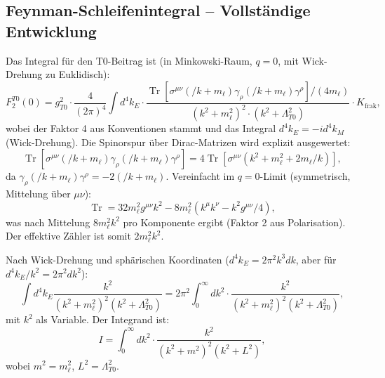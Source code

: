 \documentclass[12pt,a4paper]{article}
\begin{document}
	\subsection{Feynman-Schleifenintegral – Vollständige Entwicklung}
	Das Integral für den T0-Beitrag ist (in Minkowski-Raum, $q=0$, mit Wick-Drehung zu Euklidisch):
	\begin{equation}
		F_2^{T0}(0) = g_{T0}^2 \cdot \frac{4}{(2\pi)^4} \int d^4k_E \cdot \frac{\operatorname{Tr} \left[ \sigma^{\mu\nu} (\slash{k} + m_\ell) \gamma_\rho (\slash{k} + m_\ell) \gamma^\rho \right] / (4 m_\ell)}{ (k^2 + m_\ell^2)^2 \cdot (k^2 + \Lambda_{T0}^2) } \cdot K_\text{frak},
	\end{equation}
	wobei der Faktor 4 aus Konventionen stammt und das Integral $d^4k_E = -i d^4k_M$ (Wick-Drehung). Die Spinorspur über Dirac-Matrizen wird explizit ausgewertet:
	\begin{equation}
		\operatorname{Tr} \left[ \sigma^{\mu\nu} (\slash{k} + m_\ell) \gamma_\rho (\slash{k} + m_\ell) \gamma^\rho \right] = 4 \operatorname{Tr} \left[ \sigma^{\mu\nu} (k^2 + m_\ell^2 + 2 m_\ell \slash{k}) \right],
	\end{equation}
	da $\gamma_\rho (\slash{k} + m_\ell) \gamma^\rho = -2 (\slash{k} + m_\ell)$. Vereinfacht im $q=0$-Limit (symmetrisch, Mittelung über $\mu\nu$):
	\begin{equation}
		\operatorname{Tr} = 32 m_\ell^2 g^{\mu\nu} k^2 - 8 m_\ell^2 (k^\mu k^\nu - k^2 g^{\mu\nu}/4),
	\end{equation}
	was nach Mittelung $8 m_\ell^2 k^2$ pro Komponente ergibt (Faktor 2 aus Polarisation). Der effektive Zähler ist somit $2 m_\ell^2 k^2$.
	
	Nach Wick-Drehung und sphärischen Koordinaten ($d^4k_E = 2\pi^2 k^3 dk$, aber für $d^4k_E / k^2 = 2\pi^2 dk^2$):
	\begin{equation}
		\int d^4k_E \frac{k^2}{(k^2 + m_\ell^2)^2 (k^2 + \Lambda_{T0}^2)} = 2\pi^2 \int_0^\infty dk^2 \cdot \frac{k^2}{(k^2 + m_\ell^2)^2 (k^2 + \Lambda_{T0}^2)},
	\end{equation}
	mit $k^2$ als Variable. Der Integrand ist:
	\begin{equation}
		I = \int_0^\infty dk^2 \cdot \frac{k^2}{(k^2 + m^2)^2 (k^2 + L^2)},
	\end{equation}
	wobei $m^2 = m_\ell^2$, $L^2 = \Lambda_{T0}^2$.
	
\end{document}
